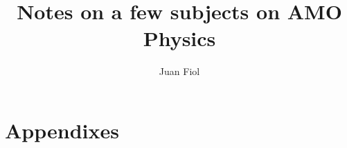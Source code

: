 \documentclass[a4paper,12pt,english,oneside,fleqn]{book}
\begin{document}
\title{Notes on a few subjects on AMO Physics}

\author{Juan Fiol}
\maketitle
\tableofcontents
%
% 
% 
% 
% 
% 
% 

% 

% 
% 
% 

% 

% 
% 

\part{Appendixes}
\appendix{}
% 
% 
% 
% 
% 

\printbibliography 
\end{document}
